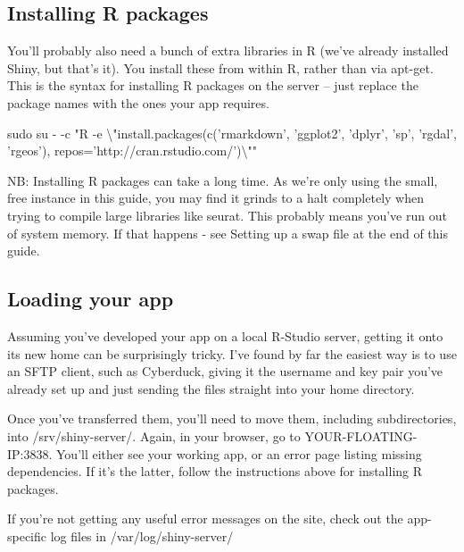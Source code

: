 \documentclass[
]{book}
\newenvironment{Shaded}{\begin{snugshade}}{\end{snugshade}}
\newcommand{\DataTypeTok}[1]{\textcolor[rgb]{0.13,0.29,0.53}{#1}}
\newcommand{\FunctionTok}[1]{\textcolor[rgb]{0.00,0.00,0.00}{#1}}
\newcommand{\NormalTok}[1]{#1}
\newcommand{\StringTok}[1]{\textcolor[rgb]{0.31,0.60,0.02}{#1}}
\begin{document}
\hypertarget{installing-r-packages}{%
\subsection{Installing R packages}\label{installing-r-packages}}

You'll probably also need a bunch of extra libraries in R (we've already installed Shiny, but that's it). You install these from within R, rather than via apt-get. This is the syntax for installing R packages on the server -- just replace the package names with the ones your app requires.

\begin{Shaded}
\begin{Highlighting}[]

\FunctionTok{sudo}\NormalTok{ su - -c }\StringTok{"R -e }\DataTypeTok{\textbackslash{}"}\StringTok{install.packages(c('rmarkdown', 'ggplot2', 'dplyr', 'sp', 'rgdal', 'rgeos'), repos='http://cran.rstudio.com/')}\DataTypeTok{\textbackslash{}"}\StringTok{"}
\end{Highlighting}
\end{Shaded}

NB: Installing R packages can take a long time. As we're only using the small, free instance in this guide, you may find it grinds to a halt completely when trying to compile large libraries like seurat. This probably means you've run out of system memory. If that happens - see Setting up a swap file at the end of this guide.

\hypertarget{loading-your-app}{%
\subsection{Loading your app}\label{loading-your-app}}

Assuming you've developed your app on a local R-Studio server, getting it onto its new home can be surprisingly tricky. I've found by far the easiest way is to use an SFTP client, such as Cyberduck, giving it the username and key pair you've already set up and just sending the files straight into your home directory.

Once you've transferred them, you'll need to move them, including subdirectories, into /srv/shiny-server/.
Again, in your browser, go to YOUR-FLOATING-IP:3838. You'll either see your working app, or an error page listing missing dependencies. If it's the latter, follow the instructions above for installing R packages.

If you're not getting any useful error messages on the site, check out the app-specific log files in /var/log/shiny-server/
\end{document}
